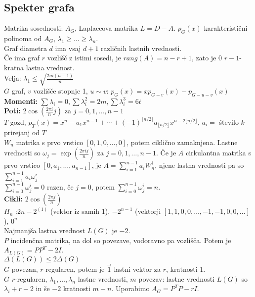 \documentclass{article}
\theoremstyle{definition}
\begin{document}
\newpage
\subsection*{Spekter grafa}
Matrika sosednosti: $A_G$, Laplaceova matrika $L = D - A$.
$p_G(x)$ karakteristični polinoma od $A_G$, $\lambda_1 \geq \ldots \geq \lambda_n$.\\
Graf diametra $d$ ima vsaj $d+1$ različnih lastnih vrednosti.\\
Če ima graf $r$ vozlišč z istimi sosedi, je $rang(A) = n-r+1$, zato je $0$ $r-1$-kratna lastna vrednost.\\
Velja: $\lambda_1 \leq \sqrt{\frac{2 m (n-1)}{n}}$\\
$G$ graf, $v$ vozlišče stopnje 1, $u \sim v$: $p_G(x) = x p_{G-v}(x) - p_{G-u-v}(x)$\\
\textbf{Momenti: } $\sum \lambda_i = 0, \sum \lambda_i^2 = 2 m, \sum \lambda_i^3 = 6 t$\\
\textbf{Poti: }$2 \cos(\frac{2 \pi i}{n} j)$ za $j = 0, 1, \ldots, n-1$\\
$T$ gozd, $p_T(x) = x^n - a_1 x^{n-1} + \cdots + (-1)^{\lfloor n/2 \rfloor} a_{\lfloor n/2 \rfloor} x^{n - 2 \lfloor n/2 \rfloor}$, $a_i =$ število $k$ prirejanj od $T$\\
$W_n$ matrika s prvo vrstico $[0,1,0,\ldots, 0]$, potem ciklično zamaknjena. Lastne vrednosti so $\omega_j = \exp(\frac{2 \pi i j}{n})$ za $j = 0, 1, \ldots, n-1$. Če je $A$ cirkulantna matrika s prvo vrstico $[0, a_1, \ldots, a_{n-1}]$, je $A = \sum_{i = 1}^{n-1} a_i W_n^i$, njene lastna vrednosti pa so $ \sum_{i = 1}^{n-1} a_i \omega_j^i$\\
$\sum_{i=0}^{n-1} \omega_j^i = 0$ razen, če $j=0$, potem $\sum_{i=0}^{n-1} \omega_j^i = n$. \\
\textbf{Cikli: }$2 \cos(\frac{2 \pi j}{n})$\\
\textbf{$H_n$ }:$2n-2^{(1)}$ (vektor iz samih 1), $-2^{n-1}$ (vektorji $[1,1,0,0,\ldots, -1,-1, 0,0,\ldots]$), $0^{n}$\\
Najmanjša lastna vrednost $L(G)$ je $-2$.\\
$P$ incidenčna matrika, na dol so povezave, vodoravno pa vozlišča. Potem je $A_{L(G)} = P P^T - 2 I$.\\
$\Delta(L(G)) \leq 2 \Delta(G)$\\
$G$ povezan, $r$-regularen, potem je $\vec{1}$ lastni vektor za $r$, kratnosti 1.\\
$G$ $r$-regularen, $\lambda_1, \ldots, \lambda_n$ lastne vrednosti, $m$ povezav: lastne vrednosti $L(G)$ so $\lambda_i + r - 2$ in še $-2$ kratnosti $m-n$. Uporabimo $A_G = P^T P - r I$.
\end{document}
